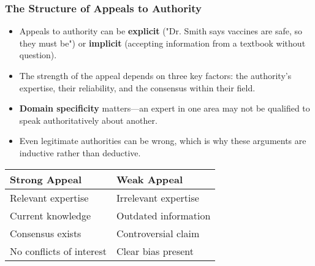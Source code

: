 \documentclass{beamer}
\begin{document}
	\begin{frame}
		\frametitle{The Structure of Appeals to Authority}
		\begin{itemize}
			\item Appeals to authority can be \textbf{explicit} ("Dr. Smith says vaccines are safe, so they must be") or \textbf{implicit} (accepting information from a textbook without question).
			\item The strength of the appeal depends on three key factors: the authority's expertise, their reliability, and the consensus within their field.
			\item \textbf{Domain specificity} matters—an expert in one area may not be qualified to speak authoritatively about another.
			\item Even legitimate authorities can be wrong, which is why these arguments are inductive rather than deductive.
		\end{itemize}
		
		\begin{table}
			\centering
			\begin{tabular}{|l|l|}
				\hline
				\textbf{Strong Appeal} & \textbf{Weak Appeal} \\
				\hline
				Relevant expertise & Irrelevant expertise \\
				Current knowledge & Outdated information \\
				Consensus exists & Controversial claim \\
				No conflicts of interest & Clear bias present \\
				\hline
			\end{tabular}
		\end{table}
	\end{frame}
	
\end{document}
